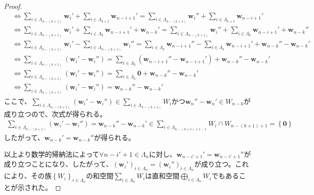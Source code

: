 \documentclass[dvipdfmx]{jsarticle}
\begin{document}
\begin{proof}
\begin{align*}
&\Leftrightarrow \sum_{i \in \varLambda_{n - (k + 1)}} \mathbf{w}_{i}' + \sum_{i \in \varLambda_{k + 1}} \mathbf{w}_{n - i + 1}' = \sum_{i \in \varLambda_{n - (k + 1)}} \mathbf{w}_{i}'' + \sum_{i \in \varLambda_{k + 1}} \mathbf{w}_{n - i + 1}'\\
&\Leftrightarrow \sum_{i \in \varLambda_{n - (k + 1)}} \mathbf{w}_{i}' + \sum_{i \in \varLambda_{k}} \mathbf{w}_{n - i + 1}' + \mathbf{w}_{n - k}' = \sum_{i \in \varLambda_{n - (k + 1)}} \mathbf{w}_{i}'' + \sum_{i \in \varLambda_{k}} \mathbf{w}_{n - i + 1}' + \mathbf{w}_{n - k}''\\
&\Leftrightarrow \sum_{i \in \varLambda_{n - (k + 1)}} \mathbf{w}_{i}' - \sum_{i \in \varLambda_{n - (k + 1)}} \mathbf{w}_{i}'' = \sum_{i \in \varLambda_{k}} \mathbf{w}_{n - i + 1}'' - \sum_{i \in \varLambda_{k}} \mathbf{w}_{n - i + 1}' + \mathbf{w}_{n - k}'' - \mathbf{w}_{n - k}'\\
&\Leftrightarrow \sum_{i \in \varLambda_{n - (k + 1)}} \left( \mathbf{w}_{i}' - \mathbf{w}_{i}'' \right) = \sum_{i \in \varLambda_{k}} \left( \mathbf{w}_{n - i + 1}'' - \mathbf{w}_{n - i + 1}' \right) + \mathbf{w}_{n - k}'' - \mathbf{w}_{n - k}'\\
&\Leftrightarrow \sum_{i \in \varLambda_{n - (k + 1)}} \left( \mathbf{w}_{i}' - \mathbf{w}_{i}'' \right) = \sum_{i \in \varLambda_{k}} \mathbf{0} + \mathbf{w}_{n - k}'' - \mathbf{w}_{n - k}'\\
&\Leftrightarrow \sum_{i \in \varLambda_{n - (k + 1)}} \left( \mathbf{w}_{i}' - \mathbf{w}_{i}'' \right) = \mathbf{w}_{n - k}'' - \mathbf{w}_{n - k}'
\end{align*}
ここで、$\sum_{i \in \varLambda_{n - (k + 1)}} \left( \mathbf{w}_{i}' - \mathbf{w}_{i}'' \right) \in \sum_{i \in \varLambda_{n - (k + 1)}} W_{i}$かつ$\mathbf{w}_{n}'' - \mathbf{w}_{n}' \in W_{n - k}$が成り立つので、次式が得られる。
\begin{align*}
\sum_{i \in \varLambda_{n - (k + 1)}} \left( \mathbf{w}_{i}' - \mathbf{w}_{i}'' \right) = \mathbf{w}_{n - k}'' - \mathbf{w}_{n - k}' \in \sum_{i \in \varLambda_{n - (k + 1) + 1 - 1}} W_{i} \cap W_{n - (k + 1) + 1} = \left\{ \mathbf{0} \right\}
\end{align*}
したがって、$\mathbf{w}_{n - k}' = \mathbf{w}_{n - k}''$が得られる。\par
以上より数学的帰納法によって$\forall n - i' + 1 \in \varLambda_{n}$に対し、$\mathbf{w}_{n - i' + 1}' = \mathbf{w}_{n - i' + 1}''$が成り立つことになり、したがって、$\left( \mathbf{w}_{i}' \right)_{i \in \varLambda_{n}} = \left( \mathbf{w}_{i}'' \right)_{i \in \varLambda_{n}}$が成り立つ。これにより、その族$\left\{ W_{i} \right\}_{i \in \varLambda_{n}}$の和空間$\sum_{i \in \varLambda_{n}} W_{i}$は直和空間$\bigoplus_{i \in \varLambda_{n}} W_{i}$でもあることが示された。
\end{proof}
\end{document}

